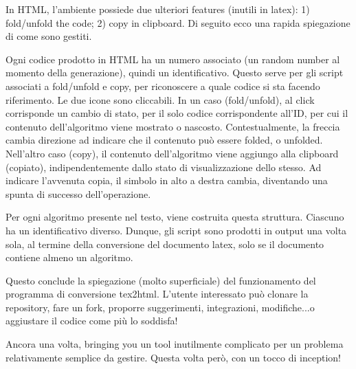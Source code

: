 In HTML, l'ambiente possiede due ulteriori features (inutili in latex): 1) fold/unfold the code; 2) copy in clipboard. Di seguito ecco una rapida spiegazione di come sono gestiti.

Ogni codice prodotto in HTML ha un numero associato (un random number al momento della generazione), quindi un identificativo. Questo serve per gli script associati a fold/unfold e copy, per riconoscere a quale codice si sta facendo riferimento. Le due icone sono cliccabili. In un caso (fold/unfold), al click corrisponde un cambio di stato, per il solo codice corrispondente all'ID, per cui il contenuto dell'algoritmo viene mostrato o nascosto. Contestualmente, la freccia cambia direzione ad indicare che il contenuto può essere folded, o unfolded. Nell'altro caso (copy), il contenuto dell'algoritmo viene aggiungo alla clipboard (copiato), indipendentemente dallo stato di visualizzazione dello stesso. Ad indicare l'avvenuta copia, il simbolo in alto a destra cambia, diventando una spunta di successo dell'operazione. 

Per ogni algoritmo presente nel testo, viene costruita questa struttura. Ciascuno ha un identificativo diverso. Dunque, gli script sono prodotti in output una volta sola, al termine della conversione del documento latex, solo se il documento contiene almeno un algoritmo. 

Questo conclude la spiegazione (molto superficiale) del funzionamento del programma di conversione tex2html. L'utente interessato può clonare la repository, fare un fork, proporre suggerimenti, integrazioni, modifiche...o aggiustare il codice come più lo soddisfa! 

Ancora una volta, bringing you un tool inutilmente complicato per un problema relativamente semplice da gestire. Questa volta però, con un tocco di inception!
